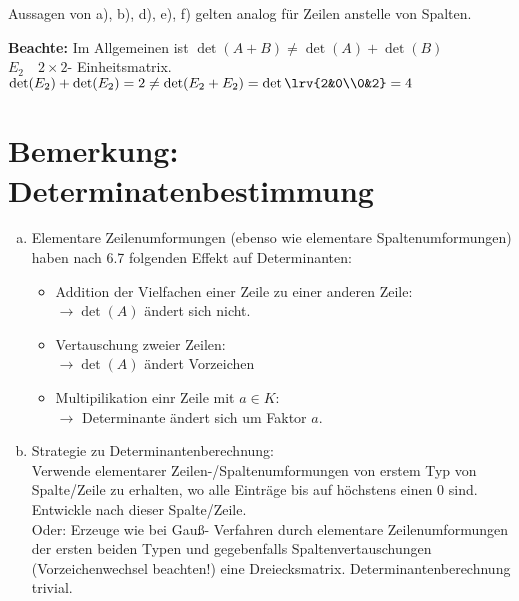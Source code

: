   Aussagen von a), b), d), e), f) gelten analog für Zeilen anstelle von
  Spalten.

  \textbf{Beachte:} Im Allgemeinen ist $\det(A+B)\neq\det(A)+\det(B)$\\

  $E_2\quad 2\times 2$- Einheitsmatrix.\\
  $\det(E_2)+\det(E_2)=2\neq\det(E_2+E_2)=\det\lrv{2&0\\0&2}=4$

\section{Bemerkung: Determinatenbestimmung}
  \begin{enumerate}[a)]
    \item Elementare Zeilenumformungen (ebenso wie elementare
      Spaltenumformungen) haben nach 6.7 folgenden Effekt auf Determinanten:
      \begin{itemize}[-]
        \item Addition der Vielfachen einer Zeile zu einer anderen Zeile:\\
          $\rightarrow\det(A)$ ändert sich nicht.
        \item Vertauschung zweier Zeilen:\\
          $\rightarrow\det(A)$ ändert Vorzeichen
        \item Multipilikation einr Zeile mit $a\in K$:\\
          $\rightarrow$ Determinante ändert sich um Faktor $a$.
      \end{itemize}
    \item Strategie zu Determinantenberechnung:\\
      Verwende elementarer Zeilen-/Spaltenumformungen von erstem Typ von
      Spalte/Zeile zu erhalten, wo alle Einträge bis auf höchstens einen 0
      sind.\\
      Entwickle nach dieser Spalte/Zeile.\\
      Oder: Erzeuge wie bei Gauß- Verfahren durch elementare Zeilenumformungen
      der ersten beiden Typen und gegebenfalls Spaltenvertauschungen
      (Vorzeichenwechsel beachten!) eine Dreiecksmatrix.
      Determinantenberechnung trivial.
  \end{enumerate}

